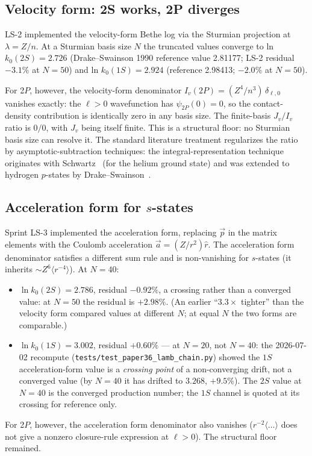 \documentclass[11pt]{article}
\begin{document}
\subsection{Velocity form: 2S works, 2P diverges}

LS-2 implemented the velocity-form Bethe log via the Sturmian
projection at $\lambda = Z/n$.  At a Sturmian basis size $N$ the
truncated values converge to ln $k_0(2S) = 2.726$ (Drake--Swainson
1990 reference value 2.81177; LS-2 residual $-3.1\%$ at $N = 50$)
and ln $k_0(1S) = 2.924$ (reference 2.98413; $-2.0\%$ at $N = 50$).

For 2$P$, however, the velocity-form denominator
$I_v(2P) = (Z^4/n^3)\,\delta_{\ell,0}$ vanishes exactly: the
$\ell > 0$ wavefunction has $\psi_{2P}(0) = 0$, so the contact-density
contribution is identically zero in any basis size.  The
finite-basis $J_v / I_v$ ratio is $0/0$, with $J_v$ being itself
finite.  This is a structural floor: no Sturmian basis size can
resolve it.  The standard literature treatment regularizes the ratio by
asymptotic-subtraction techniques: the integral-representation
technique originates with Schwartz~\cite{schwartz1961} (for the
helium ground state) and was extended to hydrogen $p$-states by
Drake--Swainson~\cite{drake_swainson}.

\subsection{Acceleration form for $s$-states}

Sprint LS-3 implemented the acceleration form, replacing $\vec{p}$
in the matrix elements with the Coulomb acceleration
$\vec{a} = (Z/r^2)\hat{r}$.  The acceleration form denominator
satisfies a different sum rule and is non-vanishing for $s$-states
(it inherits $\sim Z^6 \langle r^{-4}\rangle$).  At $N = 40$:
\begin{itemize}
\setlength\itemsep{0pt}
\item $\ln k_0(2S) = 2.786$, residual $-0.92\%$, a crossing rather than
a converged value: at $N = 50$ the residual is $+2.98\%$.  (An earlier
``$3.3\times$ tighter'' than the velocity form compared values at %
different $N$; at equal $N$ the two forms are comparable.)
\item $\ln k_0(1S) = 3.002$, residual $+0.60\%$ --- at $N = 20$, not
$N = 40$: the 2026-07-02 recompute
(\texttt{tests/test\_paper36\_lamb\_chain.py}) showed the $1S$
acceleration-form value is a \emph{crossing point} of a
non-converging drift, not a converged value (by $N = 40$ it has
drifted to $3.268$, $+9.5\%$).  The $2S$ value at $N = 40$ is the
converged production number; the $1S$ channel is quoted at its
crossing for reference only.
\end{itemize}
For 2$P$, however, the acceleration form denominator also vanishes
($r^{-2}\langle\ldots\rangle$ does not give a nonzero closure-rule
expression at $\ell > 0$).  The structural floor remained.
\end{document}

